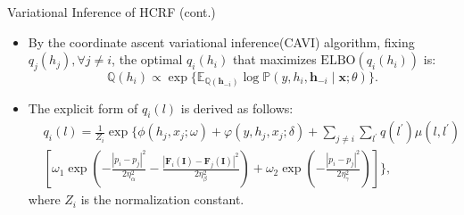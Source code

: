 \documentclass[leqno]{beamer}
\newcommand{\EE}{{\mathbb{E}}}
\newcommand{\PP}{{\mathbb{P}}}
\newcommand{\QQ}{{\mathbb{Q}}}
\newcommand{\Fb}{\mathbf{F}}
\newcommand{\Ib}{\mathbf{I}}
\newcommand{\hb}{\mathbf{h}}
\newcommand{\xb}{\mathbf{x}}
\begin{document}
\begin{frame}{Variational Inference of HCRF (cont.)}
\begin{itemize}
\item By the coordinate ascent variational inference(CAVI) algorithm, fixing
$q_j(h_j), \forall j \neq i$, the optimal $q_i(h_i)$ that maximizes
$\mathrm{ELBO}(q_i(h_i))$ is:
\begin{equation*}
\QQ(h_i) \propto \exp\{\EE_{\QQ(\hb_{-i})}
\log\PP(y, h_i, \hb_{-i} \mid \xb; \theta)\}.
\end{equation*}
\item The explicit form of $q_i(l)$ is derived as follows:
\begin{equation*}
\begin{split}
& q_i(l) = \frac{1}{Z_i} \exp \Bigg\{
\phi(h_j, x_j; \omega) + \varphi(y, h_j, x_j; \delta)
+ \sum_{j \neq i} \sum_{l^\prime} q(l^\prime) \mu(l, l^\prime) \\
& \left[ \omega_1 \exp \left(
- \frac{\left\lvert p_i - p_j \right\rvert^2}{2\eta_\alpha^2}
- \frac{\left\lvert \Fb_i(\Ib) - \Fb_j(\Ib) \right\rvert^2}{2\eta_\beta^2}
\right)
+ \omega_2 \exp \left(
- \frac{\left\lvert p_i - p_j 
\right\rvert^2}{2\eta_\gamma^2}
\right)
\right]
\Bigg\},
\end{split}
\end{equation*}
where $Z_i$ is the normalization constant.
\end{itemize}
\end{frame}
\end{document}
